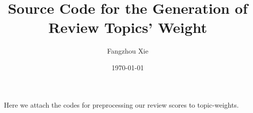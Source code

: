 \documentclass[oneside,12pt,letterpaper]{article}
\title{Source Code for the Generation of Review Topics' Weight}
\author{Fangzhou Xie}
\date{\today}
\begin{document}
\maketitle

Here we attach the codes for preprocessing our review scores
to topic-weights.



\end{document}
